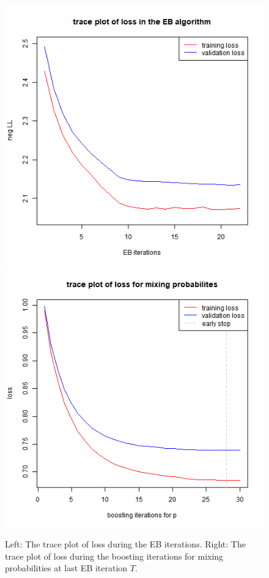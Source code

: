 \documentclass[11pt]{article}
\numberwithin{equation}{section}
\begin{document}
\begin{figure}[htp!]
		\centering
	\includegraphics[width=0.4\linewidth]{../plots/three_gaussians/loss-bst-both}
		\includegraphics[width=0.4\linewidth]{../plots/three_gaussians/loss-bst-both-p}
\caption{Left: The trace plot of loss during the EB iterations. Right: The trace plot of loss during the boosting iterations for mixing probabilities at last EB iteration $T$.}\label{gaussian-trace}
\end{figure} 
\end{document}
